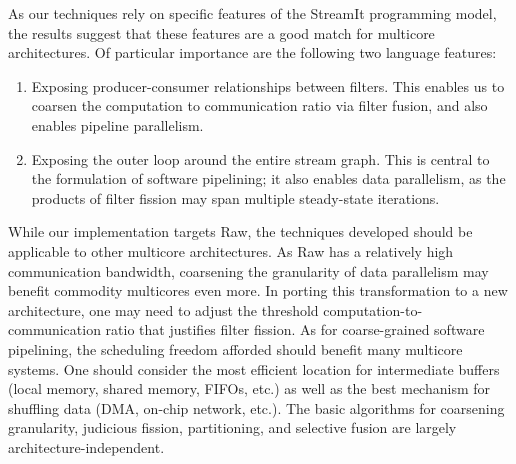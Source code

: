 As our techniques rely on specific features of the StreamIt
programming model, the results suggest that these features are a good
match for multicore architectures.  Of particular importance are the
following two language features:
\begin{enumerate}

\item Exposing producer-consumer relationships between filters.  This
enables us to coarsen the computation to communication ratio via
filter fusion, and also enables pipeline parallelism.

\item Exposing the outer loop around the entire stream graph.  This is
central to the formulation of software pipelining; it also enables
data parallelism, as the products of filter fission may span multiple
steady-state iterations.

\end{enumerate}

While our implementation targets Raw, the techniques developed should
be applicable to other multicore architectures.  As Raw has a
relatively high communication bandwidth, coarsening the granularity of
data parallelism may benefit commodity multicores even more.  In
porting this transformation to a new architecture, one may need to
adjust the threshold computation-to-communication ratio that justifies
filter fission.  As for coarse-grained software pipelining, the
scheduling freedom afforded should benefit many multicore systems.
One should consider the most efficient location for intermediate
buffers (local memory, shared memory, FIFOs, etc.) as well as the best
mechanism for shuffling data (DMA, on-chip network, etc.).  The basic
algorithms for coarsening granularity, judicious fission,
partitioning, and selective fusion are largely
architecture-independent.
